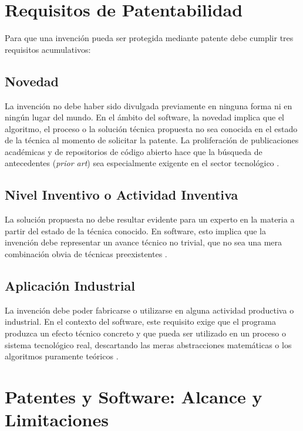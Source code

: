 \documentclass[11pt,a4paper]{report}
\begin{document}
\section{Requisitos de Patentabilidad}

Para que una invención pueda ser protegida mediante patente debe cumplir tres requisitos acumulativos:

\subsection{Novedad}

La invención no debe haber sido divulgada previamente en ninguna forma ni en ningún lugar del mundo. En el ámbito del software, la novedad implica que el algoritmo, el proceso o la solución técnica propuesta no sea conocida en el estado de la técnica al momento de solicitar la patente. La proliferación de publicaciones académicas y de repositorios de código abierto hace que la búsqueda de antecedentes (\textit{prior art}) sea especialmente exigente en el sector tecnológico \citep{ompi2024}.

\subsection{Nivel Inventivo o Actividad Inventiva}

La solución propuesta no debe resultar evidente para un experto en la materia a partir del estado de la técnica conocido. En software, esto implica que la invención debe representar un avance técnico no trivial, que no sea una mera combinación obvia de técnicas preexistentes \citep{euipo2022}.

\subsection{Aplicación Industrial}

La invención debe poder fabricarse o utilizarse en alguna actividad productiva o industrial. En el contexto del software, este requisito exige que el programa produzca un efecto técnico concreto y que pueda ser utilizado en un proceso o sistema tecnológico real, descartando las meras abstracciones matemáticas o los algoritmos puramente teóricos \citep{ompi2024}.

\section{Patentes y Software: Alcance y Limitaciones}
\end{document}
